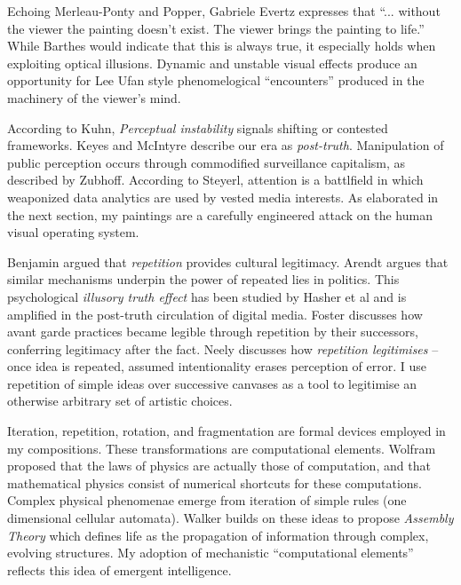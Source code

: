 \documentclass[12pt]{article}
\begin{document}
Echoing Merleau-Ponty\cite{merleauPonty1962phenomenology} and
Popper\cite{popper1972objective}, Gabriele Evertz expresses that
``... without the viewer the painting doesn't exist. The viewer brings
the painting to life.''\cite{evertz09documentary} While Barthes
would indicate that this is always true,\cite{barthes1977death} it
especially holds when exploiting optical illusions. Dynamic and
unstable visual effects produce an opportunity for Lee Ufan style
phenomelogical ``encounters''\cite[p. 52-6]{encounter} produced in
the machinery of the viewer's mind.

According to Kuhn, \emph{Perceptual instability} signals shifting or
contested frameworks.\cite[p. 64]{kuhn1970structure}
Keyes\cite{keyes2004posttruth} and
McIntyre\cite{mcintyre2018posttruth} describe our era as
\emph{post-truth}.  Manipulation of public perception occurs through
commodified surveillance capitalism, as described
by Zubhoff\cite[p. 8-12]{zuboff2019surveillance}. According to
Steyerl\cite{steyerl2016sea}, attention is a battlfield in which
weaponized data analytics are used by vested media interests. As
elaborated in the next section, my paintings are a carefully
engineered attack on the human visual operating system.

Benjamin argued that \emph{repetition} provides cultural
legitimacy.\cite{benjamin1935kunstwerk} Arendt argues that similar
mechanisms underpin the power of repeated lies in
politics.\cite{arendt1972lying} This psychological \emph{illusory
  truth effect} has been studied by Hasher et
al\cite{hasher1977frequency} and is amplified in the
post-truth\cite{keyes2004posttruth,mcintyre2018posttruth} circulation
of digital
media\cite{zuboff2019surveillance}. Foster\cite[p. 29-30]{foster1996return}
discusses how avant garde practices became legible through repetition
by their successors, conferring legitimacy after the fact. Neely
discusses how \emph{repetition legitimises} -- once idea is repeated,
assumed intentionality erases perception of
error.\cite{neely-repetition} I use repetition of simple ideas over
successive canvases as a tool to legitimise an otherwise arbitrary set
of artistic choices.

Iteration, repetition, rotation, and fragmentation are formal devices
employed in my compositions. These transformations are computational
elements. Wolfram proposed that the laws of physics
are actually those of computation, and that mathematical physics
consist of numerical shortcuts for these computations.\cite{wolfram1984} Complex
physical phenomenae emerge from iteration of simple rules
(one dimensional cellular automata)\cite{wolfram}. 
Walker builds on these ideas to propose
\emph{Assembly Theory} which defines life as the propagation of
information through complex, evolving structures.\cite{walker2024life} My adoption of
mechanistic ``computational elements'' reflects this idea of
emergent intelligence.
\end{document}
